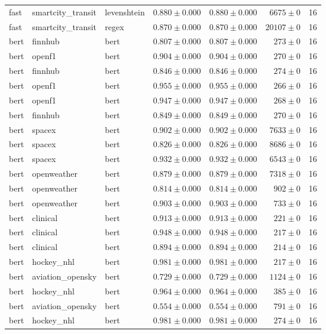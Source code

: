 \begin{table}[htbp]
\begin{tabular}{l l l r r r r}
fast & smartcity\_transit & levenshtein & $0.880\pm0.000$ & $0.880\pm0.000$ & $6675\pm0$ & 16 \\
fast & smartcity\_transit & regex & $0.870\pm0.000$ & $0.870\pm0.000$ & $20107\pm0$ & 16 \\
bert & finnhub & bert & $0.807\pm0.000$ & $0.807\pm0.000$ & $273\pm0$ & 16 \\
bert & openf1 & bert & $0.904\pm0.000$ & $0.904\pm0.000$ & $270\pm0$ & 16 \\
bert & finnhub & bert & $0.846\pm0.000$ & $0.846\pm0.000$ & $274\pm0$ & 16 \\
bert & openf1 & bert & $0.955\pm0.000$ & $0.955\pm0.000$ & $266\pm0$ & 16 \\
bert & openf1 & bert & $0.947\pm0.000$ & $0.947\pm0.000$ & $268\pm0$ & 16 \\
bert & finnhub & bert & $0.849\pm0.000$ & $0.849\pm0.000$ & $270\pm0$ & 16 \\
bert & spacex & bert & $0.902\pm0.000$ & $0.902\pm0.000$ & $7633\pm0$ & 16 \\
bert & spacex & bert & $0.826\pm0.000$ & $0.826\pm0.000$ & $8686\pm0$ & 16 \\
bert & spacex & bert & $0.932\pm0.000$ & $0.932\pm0.000$ & $6543\pm0$ & 16 \\
bert & openweather & bert & $0.879\pm0.000$ & $0.879\pm0.000$ & $7318\pm0$ & 16 \\
bert & openweather & bert & $0.814\pm0.000$ & $0.814\pm0.000$ & $902\pm0$ & 16 \\
bert & openweather & bert & $0.903\pm0.000$ & $0.903\pm0.000$ & $733\pm0$ & 16 \\
bert & clinical & bert & $0.913\pm0.000$ & $0.913\pm0.000$ & $221\pm0$ & 16 \\
bert & clinical & bert & $0.948\pm0.000$ & $0.948\pm0.000$ & $217\pm0$ & 16 \\
bert & clinical & bert & $0.894\pm0.000$ & $0.894\pm0.000$ & $214\pm0$ & 16 \\
bert & hockey\_nhl & bert & $0.981\pm0.000$ & $0.981\pm0.000$ & $217\pm0$ & 16 \\
bert & aviation\_opensky & bert & $0.729\pm0.000$ & $0.729\pm0.000$ & $1124\pm0$ & 16 \\
bert & hockey\_nhl & bert & $0.964\pm0.000$ & $0.964\pm0.000$ & $385\pm0$ & 16 \\
bert & aviation\_opensky & bert & $0.554\pm0.000$ & $0.554\pm0.000$ & $791\pm0$ & 16 \\
bert & hockey\_nhl & bert & $0.981\pm0.000$ & $0.981\pm0.000$ & $274\pm0$ & 16 \\

\end{tabular}
\end{table}
